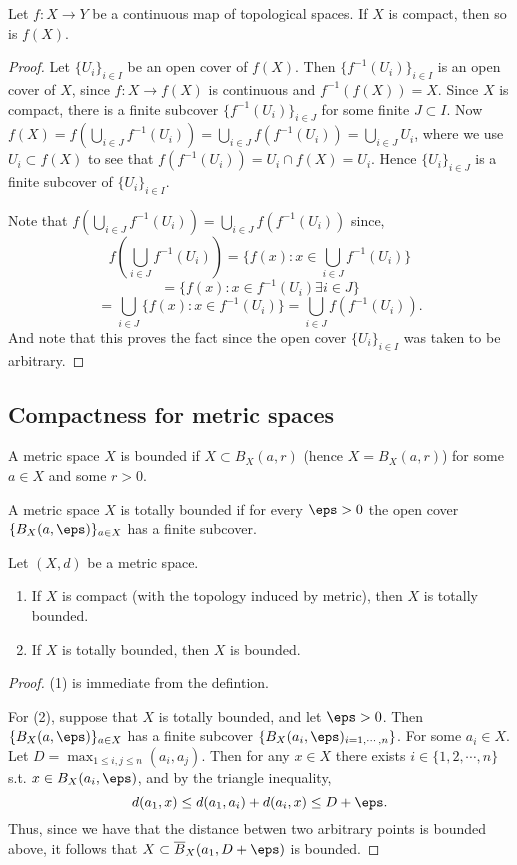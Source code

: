 \begin{proposition}
  Let $f:X\to Y$ be a continuous map of topological spaces. If $X$ is compact,
  then so is $f(X)$.
  \label{<+label+>}
\end{proposition}
\begin{proof}
  Let $\{U_i\}_{i\in I}$ be an open cover of $f(X)$. Then
  $\{f^{-1}(U_i)\}_{i\in I}$ is an open cover of $X$, since $f:X\to f(X)$ is
  continuous and $f^{-1}(f(X))=X$. Since $X$ is compact, there is a finite
  subcover $\{f^{-1}(U_i)\}_{i\in J}$ for some finite $J\subset I$. Now
  $f(X)=f(\bigcup_{i\in J}f^{-1}(U_i))= \bigcup_{i\in
  J}f(f^{-1}(U_i))=\bigcup_{i\in J}U_i$, where we use $U_i\subset f(X)$ to see
  that $f(f^{-1}(U_i))=U_i\cap f(X) = U_i$. Hence $\{U_i\}_{i\in J}$ is a finite
  subcover of $\{U_i\}_{i\in I}$.

  Note that $f(\bigcup_{i\in J}f^{-1}(U_i))= \bigcup_{i\in
  J}f(f^{-1}(U_i))$ since,
  \[f(\bigcup_{i\in J}f^{-1}(U_i))= \{f(x) : x\in \bigcup_{i\in J} f^{-1}(U_i)\}\]
  \[= \{f(x): x\in f^{-1}(U_i) \exists i\in J\}\]
  \[=\bigcup_{i\in J} \{f(x): x\in f^{-1}(U_i)\}= \bigcup_{i\in
  J}f(f^{-1}(U_i)).\]
  And note that this proves the fact since the open cover $\{U_i\}_{i\in I}$ was
  taken to be arbitrary.
\end{proof}
\subsection{Compactness for metric spaces}
\begin{definition}[Boundedness]
  A metric space $X$ is bounded if $X\subset B_X(a,r)$ (hence $X=B_X(a,r)$) for
  some $a\in X$ and some $r>0$.
  \label{def:boundednessMetricSpace}
\end{definition}
\begin{definition}
  A metric space $X$ is totally bounded if for every $\eps>0$ the open cover
  $\{B_X(a,\eps)\}_{a\in X}$ has a finite subcover.
  \label{def:totallyBoundedMetricSpace}
\end{definition}
\begin{lemma}
  Let $(X,d)$ be a metric space.
  \begin{enumerate}
    \item If $X$ is compact (with the topology induced by metric), then $X$ is
      totally bounded.
    \item If $X$ is totally bounded, then $X$ is bounded.
  \end{enumerate}
  \label{lem:boundednessMetricSpaces}
\end{lemma}
\begin{proof}
  (1) is immediate from the defintion.

  For (2), suppose that $X$ is totally bounded, and let $\eps>0$. Then
  $\{B_X(a,\eps)\}_{a\in X}$ has a finite subcover $\{B_X(a_i,
  \eps)_{i=1,\cdots, n}\}$. For some $a_i\in X$. Let $D= \max_{1\leq i,j\leq n}
  (a_i, a_j)$. Then for any $x\in X$ there exists $i\in\{1,2,\cdots, n\}$ s.t.
  $x\in B_X(a_i,\eps)$, and by the triangle inequality,
  \[d(a_1, x) \leq d(a_1, a_i) +d(a_i, x) \leq D+\eps.\]
  Thus, since we have that the distance betwen two arbitrary points is bounded
  above, it follows that $X\subset \overline{B}_X(a_1, D+\eps)$ is bounded.
\end{proof}
